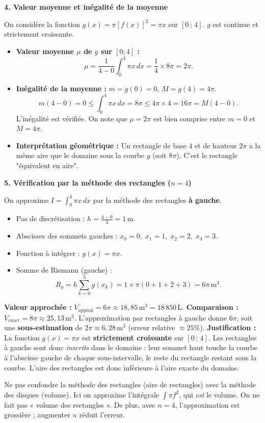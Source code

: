 \documentclass[11pt]{article}
\begin{document}
\begin{exoresolu}
\textbf{4. Valeur moyenne et inégalité de la moyenne}\par
On considère la fonction $g(x) = \pi [f(x)]^2 = \pi x$ sur $[0\,;\,4]$. $g$ est continue et strictement croissante.
\begin{itemize}
    \item \textbf{Valeur moyenne $\mu$ de $g$ sur $[0;4]$ :}
    \[ \mu = \frac{1}{4-0} \int_0^4 \pi x \, dx = \frac{1}{4} \times 8\pi = 2\pi. \]
    \item \textbf{Inégalité de la moyenne :} $m = g(0) = 0$, $M = g(4) = 4\pi$.
    \[ m(4-0) = 0 \le \int_0^4 \pi x \, dx = 8\pi \le 4\pi \times 4 = 16\pi = M(4-0). \]
    L'inégalité est vérifiée. On note que $\mu = 2\pi$ est bien comprise entre $m=0$ et $M=4\pi$.
    \item \textbf{Interprétation géométrique :} Un rectangle de base $4$ et de hauteur $2\pi$ a la même aire que le domaine sous la courbe $g$ (soit $8\pi$). C'est le rectangle "équivalent en aire".
\end{itemize}

\textbf{5. Vérification par la méthode des rectangles ($n=4$)}\par
On approxime $I = \int_0^4 \pi x \, dx$ par la méthode des rectangles \textbf{à gauche}.
\begin{itemize}
    \item Pas de discrétisation : $h = \frac{4-0}{4} = 1\,\text{m}$.
    \item Abscisses des sommets gauches : $x_0=0,\; x_1=1,\; x_2=2,\; x_3=3$.
    \item Fonction à intégrer : $g(x) = \pi x$.
    \item Somme de Riemann (gauche) :
    \[ R_g = h \sum_{k=0}^{3} g(x_k) = 1 \times \pi (0 + 1 + 2 + 3) = 6\pi \,\text{m}^3. \]
\end{itemize}
\textbf{Valeur approchée :} $V_{\text{approx}} = 6\pi \approx 18,85\,\text{m}^3 = 18\,850\,\text{L}$.
\textbf{Comparaison :} $V_{\text{exact}} = 8\pi \approx 25,13\,\text{m}^3$.
L'approximation par rectangles à gauche donne $6\pi$, soit une \textbf{sous-estimation} de $2\pi \approx 6,28\,\text{m}^3$ (erreur relative $\approx 25\%$).
\textbf{Justification :} La fonction $g(x) = \pi x$ est \textbf{strictement croissante} sur $[0\,;\,4]$. Les rectangles à gauche sont donc \emph{inscrits} dans le domaine : leur sommet haut touche la courbe à l'abscisse gauche de chaque sous-intervalle, le reste du rectangle restant sous la courbe. L'aire des rectangles est donc inférieure à l'aire exacte du domaine.
\begin{attention}
Ne pas confondre la méthode des rectangles (aire de rectangles) avec la méthode des disques (volume). Ici on approxime l'intégrale $\int \pi f^2$, qui \emph{est} le volume. On ne fait pas « volume des rectangles ». De plus, avec $n=4$, l'approximation est grossière ; augmenter $n$ réduit l'erreur.
\end{attention}


\end{exoresolu}
\end{document}
